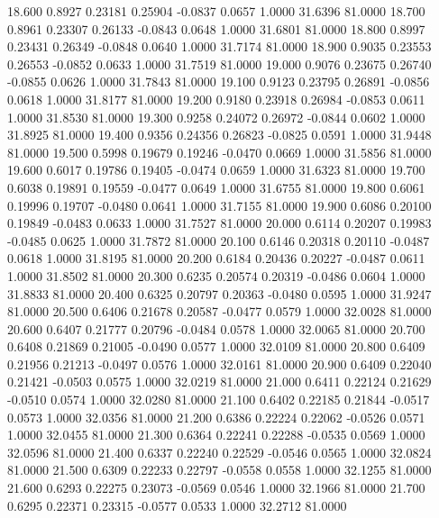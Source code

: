   18.600   0.8927   0.23181   0.25904  -0.0837   0.0657   1.0000  31.6396  81.0000
  18.700   0.8961   0.23307   0.26133  -0.0843   0.0648   1.0000  31.6801  81.0000
  18.800   0.8997   0.23431   0.26349  -0.0848   0.0640   1.0000  31.7174  81.0000
  18.900   0.9035   0.23553   0.26553  -0.0852   0.0633   1.0000  31.7519  81.0000
  19.000   0.9076   0.23675   0.26740  -0.0855   0.0626   1.0000  31.7843  81.0000
  19.100   0.9123   0.23795   0.26891  -0.0856   0.0618   1.0000  31.8177  81.0000
  19.200   0.9180   0.23918   0.26984  -0.0853   0.0611   1.0000  31.8530  81.0000
  19.300   0.9258   0.24072   0.26972  -0.0844   0.0602   1.0000  31.8925  81.0000
  19.400   0.9356   0.24356   0.26823  -0.0825   0.0591   1.0000  31.9448  81.0000
  19.500   0.5998   0.19679   0.19246  -0.0470   0.0669   1.0000  31.5856  81.0000
  19.600   0.6017   0.19786   0.19405  -0.0474   0.0659   1.0000  31.6323  81.0000
  19.700   0.6038   0.19891   0.19559  -0.0477   0.0649   1.0000  31.6755  81.0000
  19.800   0.6061   0.19996   0.19707  -0.0480   0.0641   1.0000  31.7155  81.0000
  19.900   0.6086   0.20100   0.19849  -0.0483   0.0633   1.0000  31.7527  81.0000
  20.000   0.6114   0.20207   0.19983  -0.0485   0.0625   1.0000  31.7872  81.0000
  20.100   0.6146   0.20318   0.20110  -0.0487   0.0618   1.0000  31.8195  81.0000
  20.200   0.6184   0.20436   0.20227  -0.0487   0.0611   1.0000  31.8502  81.0000
  20.300   0.6235   0.20574   0.20319  -0.0486   0.0604   1.0000  31.8833  81.0000
  20.400   0.6325   0.20797   0.20363  -0.0480   0.0595   1.0000  31.9247  81.0000
  20.500   0.6406   0.21678   0.20587  -0.0477   0.0579   1.0000  32.0028  81.0000
  20.600   0.6407   0.21777   0.20796  -0.0484   0.0578   1.0000  32.0065  81.0000
  20.700   0.6408   0.21869   0.21005  -0.0490   0.0577   1.0000  32.0109  81.0000
  20.800   0.6409   0.21956   0.21213  -0.0497   0.0576   1.0000  32.0161  81.0000
  20.900   0.6409   0.22040   0.21421  -0.0503   0.0575   1.0000  32.0219  81.0000
  21.000   0.6411   0.22124   0.21629  -0.0510   0.0574   1.0000  32.0280  81.0000
  21.100   0.6402   0.22185   0.21844  -0.0517   0.0573   1.0000  32.0356  81.0000
  21.200   0.6386   0.22224   0.22062  -0.0526   0.0571   1.0000  32.0455  81.0000
  21.300   0.6364   0.22241   0.22288  -0.0535   0.0569   1.0000  32.0596  81.0000
  21.400   0.6337   0.22240   0.22529  -0.0546   0.0565   1.0000  32.0824  81.0000
  21.500   0.6309   0.22233   0.22797  -0.0558   0.0558   1.0000  32.1255  81.0000
  21.600   0.6293   0.22275   0.23073  -0.0569   0.0546   1.0000  32.1966  81.0000
  21.700   0.6295   0.22371   0.23315  -0.0577   0.0533   1.0000  32.2712  81.0000

